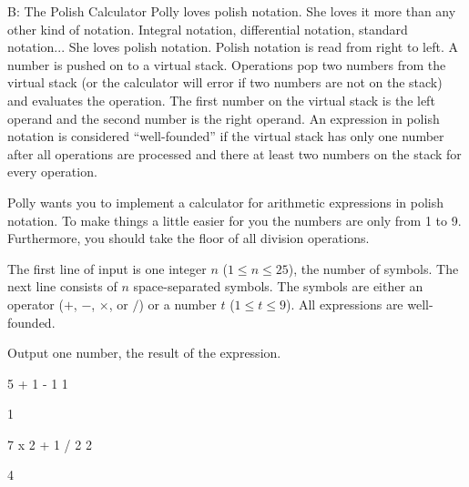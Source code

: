 \begin{problem}{B: The Polish Calculator}
Polly loves polish notation.
She loves it more than any other kind of notation.
Integral notation, differential notation, standard notation...
She loves polish notation.
Polish notation is read from right to left.
A number is pushed on to a virtual stack.
Operations pop two numbers from the virtual stack (or the calculator will error if two numbers are not on the stack) and evaluates the operation.
The first number on the virtual stack is the left operand and the second number is the right operand.
An expression in polish notation is considered ``well-founded'' if the virtual stack has only one number after all operations are processed and there at least two numbers on the stack for every operation.

Polly wants you to implement a calculator for arithmetic expressions in polish notation.
To make things a little easier for you the numbers are only from 1 to 9.
Furthermore, you should take the floor of all division operations.
\end{problem}

\begin{formalin}
The first line of input is one integer $n$ ($1 \leq n \leq 25$), the number of symbols.
The next line consists of $n$ space-separated symbols.
The symbols are either an operator ($+$, $-$, $\times$, or $/$) or a number $t$ ($1 \leq t \leq 9$).
All expressions are well-founded.
\end{formalin}

\begin{formalout}
Output one number, the result of the expression.
\end{formalout}

\begin{datain}
5
+ 1 - 1 1
\end{datain}
\begin{dataout}
1
\end{dataout}

\begin{datain}
7
x 2 + 1 / 2 2
\end{datain}
\begin{dataout}
4
\end{dataout}

